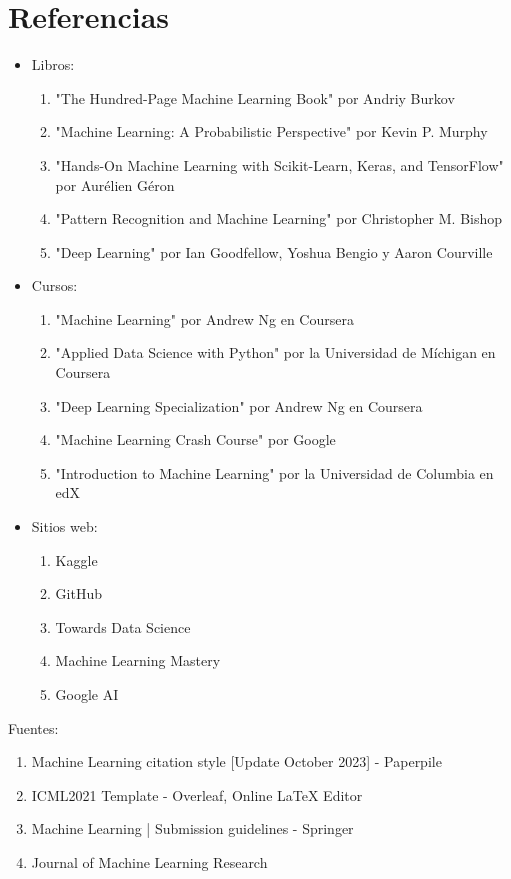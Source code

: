 \documentclass{article}
\begin{document}
\section{Referencias}
\begin{itemize}
    \item Libros:
        \begin{enumerate}
            \item "The Hundred-Page Machine Learning Book" por Andriy Burkov
            \item "Machine Learning: A Probabilistic Perspective" por Kevin P. Murphy
            \item "Hands-On Machine Learning with Scikit-Learn, Keras, and TensorFlow" por Aurélien Géron
            \item "Pattern Recognition and Machine Learning" por Christopher M. Bishop
            \item "Deep Learning" por Ian Goodfellow, Yoshua Bengio y Aaron Courville
        \end{enumerate}
    \item Cursos:
        \begin{enumerate}
            \item "Machine Learning" por Andrew Ng en Coursera
            \item "Applied Data Science with Python" por la Universidad de Míchigan en Coursera
            \item "Deep Learning Specialization" por Andrew Ng en Coursera
            \item "Machine Learning Crash Course" por Google
            \item "Introduction to Machine Learning" por la Universidad de Columbia en edX
        \end{enumerate}
    \item Sitios web:
        \begin{enumerate}
            \item Kaggle
            \item GitHub
            \item Towards Data Science
            \item Machine Learning Mastery
            \item Google AI
        \end{enumerate}
\end{itemize}


Fuentes:
\begin{enumerate}
    \item Machine Learning citation style [Update October 2023] - Paperpile
    \item ICML2021 Template - Overleaf, Online LaTeX Editor
    \item Machine Learning | Submission guidelines - Springer
    \item Journal of Machine Learning Research
\end{enumerate}
\end{document}
